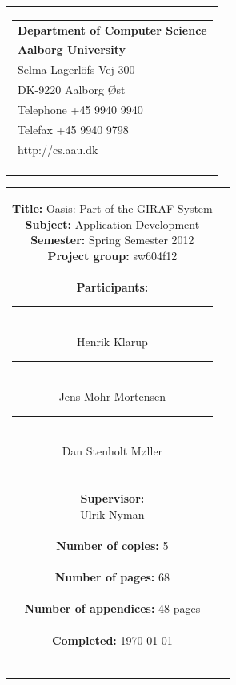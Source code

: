 \begin{nopagebreak}
\samepage 
\begin{tabular}{r}
\parbox{\textwidth}{
\hfill \parbox{6.2cm}{\begin{tabular}{l}
{\textsf\small \textbf{Department of Computer Science }}\\
{\textsf\small  \textbf{Aalborg University}}\\
{\textsf\small Selma Lagerl\"{o}fs Vej 300}\\
{\textsf\small DK-9220 Aalborg Øst}\\
{\textsf\small Telephone +45 9940 9940}\\
{\textsf\small Telefax +45 9940 9798}\\
{\textsf\small http://cs.aau.dk}
\end{tabular}}}
\end{tabular}

\begin{tabular}{cc}
\parbox{7cm}{
\vspace{-2.15cm}
\textbf{Title:} 
Oasis: Part of the GIRAF System\\
\textbf{Subject:} 
Application Development\\
\textbf{Semester:} Spring Semester 2012\\
\textbf{Project group:} sw604f12\\ \\
\textbf{Participants:} \\
\rule[-0.1cm]{5cm}{0.01cm} \\
Henrik Klarup \\
\rule[-0.1cm]{5cm}{0.01cm} \\
Jens Mohr Mortensen \\
\rule[-0.1cm]{5cm}{0.01cm} \\
Dan Stenholt M\o{}ller \\ \\ \\

\textbf{Supervisor:} \\
Ulrik Nyman\\ \\
\textbf{Number of copies:}
5 \\ \\
\textbf{Number of pages:}
68 \\ \\
\textbf{Number of appendices:}
48 pages\\ \\
\textbf{Completed:}
\today \\ \\
}


\end{tabular}
\end{nopagebreak}
